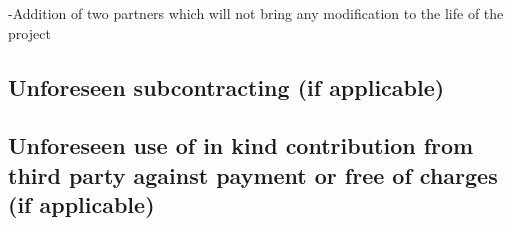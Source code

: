 \documentclass{deliverablereport}
\begin{document}
  -Addition of two partners which will not bring any modification to the life of the
  project

  \subsection{Unforeseen subcontracting (if applicable)}


  \subsection{Unforeseen use of in kind contribution from third party against payment or
    free of charges (if applicable)}

\end{document}
